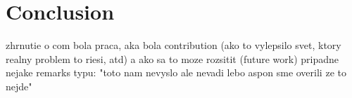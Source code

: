 \chapter*{Conclusion}

{\color{red} zhrnutie o com bola praca, aka bola contribution (ako to vylepsilo svet, ktory realny problem to riesi, atd) a ako sa to moze rozsitit (future work)
pripadne nejake remarks typu: "toto nam nevyslo ale nevadi lebo aspon sme overili ze to nejde"}